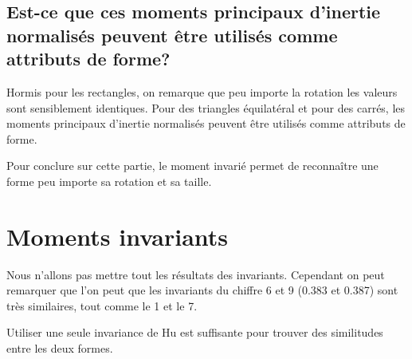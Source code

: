 \documentclass[a4paper,12pt]{report}
\begin{document}
\subsection*{Est-ce que ces moments principaux d'inertie normalisés peuvent être utilisés comme attributs de forme?}

Hormis pour les rectangles, on remarque que peu importe la rotation les valeurs sont sensiblement identiques. Pour des triangles équilatéral et pour des carrés, les moments principaux d'inertie normalisés peuvent être utilisés comme attributs de forme.

Pour conclure sur cette partie, le moment invarié permet de reconnaître une forme peu importe sa rotation et sa taille.


\section*{Moments invariants}

Nous n'allons pas mettre tout les résultats des invariants. Cependant on peut remarquer que l'on peut que les invariants du chiffre 6 et 9 (0.383 et 0.387) sont très similaires, tout comme le 1 et le 7. 

Utiliser une seule invariance de Hu est suffisante pour trouver des similitudes entre les deux formes. 
\end{document}

